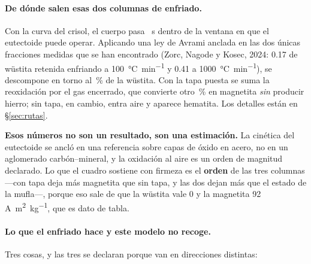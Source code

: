 \documentclass[11pt,a4paper]{article}
\newcommand{\ojo}[1]{\textcolor{aviso}{\textbf{#1}}}
\begin{document}
\begin{table}[H]
\centering
\resizebox{\textwidth}{!}{}
\caption{\textbf{Lo que se recupera ya frío}, en \% en masa. Cada fila responde
a «lo saqué a los $t$ segundos: ¿qué tengo?», y cada celda de las cinco últimas
columnas da los \textbf{tres estados en el mismo orden}:
\emph{en la mufla / con tapa / sin tapa}. El primero es el estado a
\SI{900}{\celsius} sin enfriar, y los otros dos son lo que queda al dejarlo
llegar a temperatura ambiente por cada camino. Las cuatro fases de la izquierda
salen iguales en los tres casos: no tienen ninguna transformación accesible
entre \SI{900}{\celsius} y el ambiente. La masa tampoco cambia al enfriar,
porque todo lo que ocurre son reorganizaciones en estado sólido.}
\label{tab:enfriado}
\end{table}

\paragraph{De dónde salen esas dos columnas de enfriado.} Con la curva del
crisol, el cuerpo pasa \datEnfriaVentana\ \si{\second} dentro de la ventana en
que el eutectoide puede operar. Aplicando una ley de Avrami anclada en las dos
únicas fracciones medidas que se han encontrado (Zorc, Nagode y Kosec, 2024:
\num{0.17} de wüstita retenida enfriando a \SI{100}{\celsius\per\minute} y
\num{0.41} a \SI{1000}{\celsius\per\minute}), se descompone en torno al
\datFraccionEutectoide\,\% de la wüstita. Con la tapa puesta se suma la
reoxidación por el gas encerrado, que convierte otro \datReoxidaGas\,\% en
magnetita \emph{sin} producir hierro; sin tapa, en cambio, entra aire y aparece
hematita. Los detalles están en \S\ref{sec:rutas}.

\ojo{Esos números no son un resultado, son una estimación.} La cinética del
eutectoide se ancló en una referencia sobre capas de óxido en acero, no en un
aglomerado carbón--mineral, y la oxidación al aire es un orden de magnitud
declarado. Lo que el cuadro sostiene con firmeza es el \textbf{orden} de las
tres columnas ---con tapa deja más magnetita que sin tapa, y las dos dejan más
que el estado de la mufla---, porque eso sale de que la wüstita vale 0 y la
magnetita 92 \si{\ampere\meter\squared\per\kilo\gram}, que es dato de tabla.

\paragraph{Lo que el enfriado hace y este modelo no recoge.} Tres cosas, y las
tres se declaran porque van en direcciones distintas:
\end{document}
